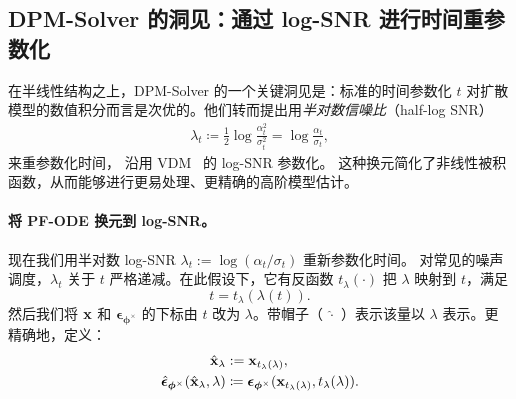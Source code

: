\subsection{DPM-Solver 的洞见：通过 log-SNR 进行时间重参数化}\label{subsec:dpm-method}   
在半线性结构之上，DPM-Solver 的一个关键洞见是：标准的时间参数化 $t$ 对扩散模型的数值积分而言是次优的。他们转而提出用\emph{半对数信噪比}（half-log SNR）
\begin{align}\label{eq:lambda}
    \lambda_t \coloneqq \frac{1}{2}\log \frac{\alpha_t^2}{\sigma_t^2}  =  \log \frac{\alpha_t}{\sigma_t},
\end{align}
来重参数化时间，
沿用 VDM~\citep{kingma2021variational} 的 log-SNR 参数化。
这种换元简化了非线性被积函数，从而能够进行更易处理、更精确的高阶模型估计。






\paragraph{将 PF-ODE 换元到 log-SNR。} 现在我们用半对数 log-SNR $\lambda_t := \log(\alpha_t/\sigma_t)$ 重新参数化时间。
对常见的噪声调度，$\lambda_t$ 关于 $t$ 严格递减。在此假设下，它有反函数 $t_\lambda(\cdot)$ 把 $\lambda$ 映射到 $t$，满足
\[
t = t_\lambda(\lambda(t)).
\]
然后我们将 ${\mathbf{x}}$ 和 $\bm{\epsilon}_{\bm{\phi}^\times}$ 的下标由 $t$ 改为 $\lambda$。带帽子（  $\hat{\cdot}$  ）表示该量以 $\lambda$ 表示。更精确地，定义：
\begin{align}
\begin{aligned}
    \label{eq:change-of-var-x-epsilon}
 \hat{{\mathbf{x}}}_{\lambda} & := {\mathbf{x}}_{t_\lambda(\lambda)}, \\
 \hat{\bm{\epsilon}}_{\bm{\phi}^\times}(\hat{{\mathbf{x}}}_{\lambda}, \lambda) & \coloneqq \bm{\epsilon}_{\bm{\phi}^\times}({\mathbf{x}}_{t_\lambda(\lambda)}, t_\lambda(\lambda)).
\end{aligned}
\end{align}

